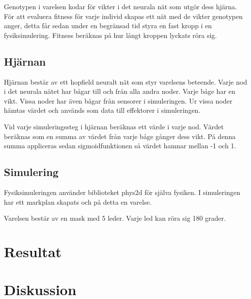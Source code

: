 \documentclass[titlepage, a4paper, 12pt]{article}
\begin{document}
		Genotypen i varelsen kodar för vikter i det neurala nät som utgör dess hjärna. För att evaluera fitness för varje individ skapas ett nät med de vikter genotypen anger, detta får sedan under en begränsad tid styra en fast kropp i en fysiksimulering. Fitness beräknas på hur långt kroppen lyckats röra sig.
		


	\subsection{Hjärnan}
		Hjärnan består av ett hopfield neuralt nät som styr varelsens beteende. Varje nod i det neurala nätet har bågar till och från alla andra noder. Varje båge har en vikt. Vissa noder har även bågar från sensorer i simuleringen. Ur vissa noder hämtas värdet och används som data till effektorer i simuleringen. 

		Vid varje simuleringssteg i hjärnan beräknas ett värde i varje nod. Värdet beräknas som en summa av värdet från varje båge gånger dess vikt. På denna summa appliceras sedan sigmoidfunktionen så värdet hamnar mellan -1 och 1. 

		

	\subsection{Simulering}
		
		Fysiksimuleringen använder biblioteket phys2d för själva fysiken. I simuleringen har ett markplan skapats och på detta en varelse. 

		Varelsen består av en mask med 5 leder. Varje led kan röra sig 180 grader. 


\section{Resultat}
\section{Diskussion}
\end{document}
